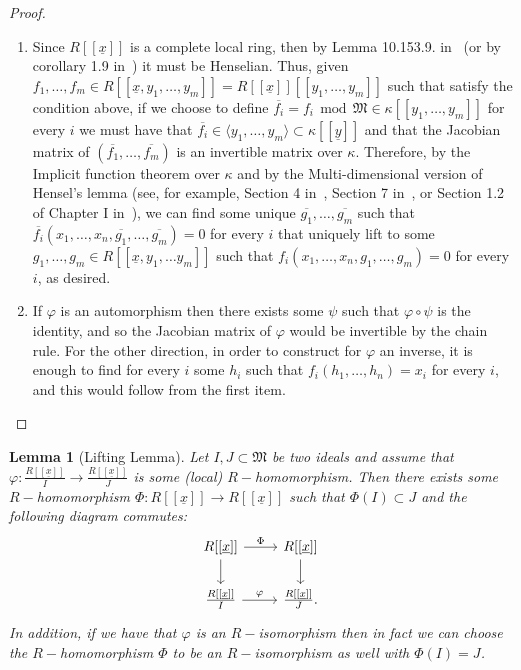 \documentclass{article}
\newtheorem{lemma}[theorem]{Lemma}
\numberwithin{theorem}{section}
\renewcommand{\mod}{\,\operatorname{mod}\,}
\begin{document}
\begin{proof}
    \begin{enumerate}
        \item Since $R[[\underline{x}]]$ is a complete local ring, then by Lemma 10.153.9. in~\cite{stacks-project} (or by corollary 1.9 in~\cite{leuschke2012cohen}) it must be Henselian. Thus, given $f_1, \dots, f_m \in R[[\underline{x},y_1, \dots, y_m ]]=R[[\underline{x}]][[y_1, \dots, y_m]]$ such that satisfy the condition above, if we choose to define $\overline{f_i} = f_i \mod \mathfrak{M} \in \kappa[[y_1, \dots, y_m]]$ for every $i$ we must have that $\overline{f_i}\in \langle y_1, \dots, y_m \rangle \subset \kappa[[\underline{y}]]$ and that the Jacobian matrix of $(\overline{f_1}, \dots, \overline{f_m})$ is an invertible matrix over $\kappa$. Therefore, by the Implicit function theorem over $\kappa$ and by the Multi-dimensional version of Hensel's lemma (see, for example, Section 4 in~\cite{kuhlmann2000valuation}, Section 7 in~\cite{ziegler1978model}, or Section 1.2 of Chapter I in~\cite{greuel2007introduction}), we can find some unique $\overline{g_1}, \dots, \overline{g_m}$ such that $\overline{f_i}\left(x_1, \dots, x_n, \overline{g_1}, \dots, \overline{g_m}\right)=0$ for every $i$ that uniquely lift to some $g_1, \dots, g_m \in R[[\underline{x},y_1, \dots y_m]]$ such that $f_i\left(x_1, \dots, x_n, g_1, \dots, g_m\right)=0$ for every $i$, as desired.
        \item If $\varphi$ is an automorphism then there exists some $\psi$ such that $\varphi \circ \psi$ is the identity, and so the Jacobian matrix of $\varphi$ would be invertible by the chain rule. For the other direction, in order to construct for $\varphi$ an inverse, it is enough to find for every $i$ some $h_i$ such that $f_i(h_1, \dots, h_n)=x_i$ for every $i$, and this would follow from the first item. 
    \end{enumerate}
\end{proof}



\begin{lemma}[Lifting Lemma]\label{lem:lifting}
     Let $I, J \subset  \mathfrak{M}$ be two ideals and assume that $\varphi \colon \frac{R[[\underline{x}]]}{I} \to \frac{R[[\underline{x}]]}{J}$ is some (local) $R-$homomorphism. Then there exists some $R-$homomorphism $\Phi \colon R[[\underline{x}]] \to R[[\underline{x}]]$ such that $\Phi(I) \subset J$ and the following diagram commutes:
    \begin{equation*}
        \begin{tikzcd}
    R[[\underline{x}]] \arrow[r, "\Phi"] \arrow[d]
    & R[[\underline{x}]] \arrow[d, ] \\
    \frac{R[[\underline{x}]]}{I} \arrow[r,  "\varphi" ]
    & |[]| \frac{R[[\underline{x}]]}{J}.
    \end{tikzcd}
    \end{equation*}
    In addition, if we have that $\varphi$ is an $R-$isomorphism then in fact we can choose the $R-$homomorphism $\Phi$ to be an $R-$isomorphism as well with $\Phi(I)=J$. 
\end{lemma}
\end{document}
